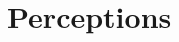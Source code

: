 \documentclass[aspectratio=169,9pt,dvipsnames]{beamer}
\begin{document}

\section{Perceptions}
\end{document}
